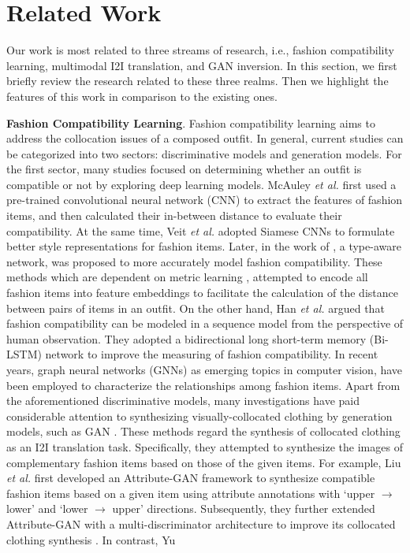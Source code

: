 \section{Related Work}
\label{related_work}
	
	Our work is most related to three streams of research, i.e., fashion compatibility learning, multimodal I2I translation, and GAN inversion. In this section, we first briefly review the research related to these three realms. Then we highlight the features of this work in comparison to the existing ones.
	
	\textbf{Fashion Compatibility Learning}. Fashion compatibility learning aims to address the collocation issues of a composed outfit. In general, current studies can be categorized into two sectors: discriminative models and generation models. For the first sector, many studies \cite{mcauley2015image,veit2015learning,vasileva2018learning,han2017learning,cui2019dressing,li2020hierarchical} focused on determining whether an outfit is compatible or not by exploring deep learning models. McAuley \textit{et al.} \cite{mcauley2015image} first used a pre-trained convolutional neural network (CNN) \cite{zhao2020scgan,xie2021dual,peng2022robust} to extract the features of fashion items, and then calculated their in-between distance to evaluate their compatibility. At the same time, Veit \textit{et al.} \cite{veit2015learning} adopted Siamese CNNs to formulate better style representations for fashion items. Later, in the work of \cite{vasileva2018learning}, a type-aware network, was proposed to more accurately model fashion compatibility. These methods which are dependent on metric learning \cite{chopra2005learning}, attempted to encode all fashion items into feature embeddings to facilitate the calculation of the distance between pairs of items in an outfit. On the other hand, Han \textit{et al.} \cite{han2017learning} argued that fashion compatibility can be modeled in a sequence model from the perspective of human observation. They adopted a bidirectional long short-term memory (Bi-LSTM) network \cite{bi_lstm} to improve the measuring of fashion compatibility. In recent years, graph neural networks (GNNs) \cite{cui2019dressing,li2020hierarchical} as emerging topics in computer vision, have been employed to characterize the relationships among fashion items. Apart from the aforementioned discriminative models, many investigations \cite{liu2019toward,liu2019collocating,yu2019personalized,outfitgan,coutfitgan} have paid considerable attention to synthesizing visually-collocated clothing by generation models, such as GAN \cite{goodfellow2014generative}. These methods regard the synthesis of collocated clothing as an I2I translation task. Specifically, they attempted to synthesize the images of complementary fashion items based on those of the given items. For example, Liu \textit{et al.} \cite{liu2019toward} first developed an Attribute-GAN framework to synthesize compatible fashion items based on a given item using attribute annotations with `upper $\rightarrow$ lower' and `lower $\rightarrow$ upper' directions. Subsequently, they further extended Attribute-GAN with a multi-discriminator architecture to improve its collocated clothing synthesis \cite{liu2019collocating}. In contrast, Yu 